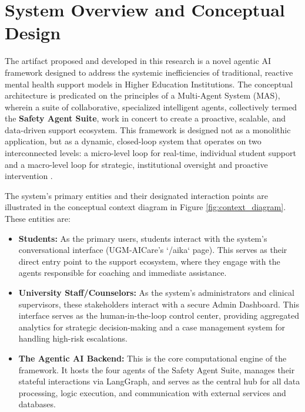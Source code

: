 \section{System Overview and Conceptual Design}

The artifact proposed and developed in this research is a novel agentic AI framework designed to address the systemic inefficiencies of traditional, reactive mental health support models in Higher Education Institutions. The conceptual architecture is predicated on the principles of a Multi-Agent System (MAS), wherein a suite of collaborative, specialized intelligent agents, collectively termed the \textbf{Safety Agent Suite}, work in concert to create a proactive, scalable, and data-driven support ecosystem. This framework is designed not as a monolithic application, but as a dynamic, closed-loop system that operates on two interconnected levels: a micro-level loop for real-time, individual student support and a macro-level loop for strategic, institutional oversight and proactive intervention \cite{kashiv2025aidrivennetworks, nwoke2025insightautomation}.

The system's primary entities and their designated interaction points are illustrated in the conceptual context diagram in Figure \ref{fig:context_diagram}. These entities are:
\begin{itemize}
    \item \textbf{Students:} As the primary users, students interact with the system's conversational interface (UGM-AICare's `/aika` page). This serves as their direct entry point to the support ecosystem, where they engage with the agents responsible for coaching and immediate assistance.
    \item \textbf{University Staff/Counselors:} As the system's administrators and clinical supervisors, these stakeholders interact with a secure Admin Dashboard. This interface serves as the human-in-the-loop control center, providing aggregated analytics for strategic decision-making and a case management system for handling high-risk escalations.
    \item \textbf{The Agentic AI Backend:} This is the core computational engine of the framework. It hosts the four agents of the Safety Agent Suite, manages their stateful interactions via LangGraph, and serves as the central hub for all data processing, logic execution, and communication with external services and databases.
\end{itemize}

